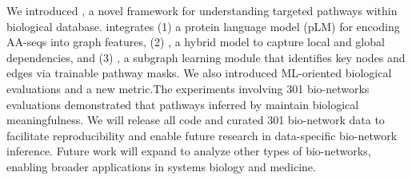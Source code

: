 
We introduced \method, a novel framework for understanding targeted pathways within biological database. \method integrates (1) a protein language model (pLM) for encoding AA-seqs into graph features, (2) \classifier, a hybrid model to capture local and global dependencies, and (3) \explainer, a subgraph learning module that identifies key nodes and edges via trainable pathway masks. 
We also introduced ML-oriented biological evaluations and a new metric.The experiments involving 301 bio-networks evaluations demonstrated that pathways inferred by \method maintain biological meaningfulness.
We will release all code and curated 301 bio-network data to facilitate reproducibility and enable future research in data-specific bio-network inference.
Future work will expand \method to analyze other types of bio-networks, enabling broader applications in systems biology and medicine.